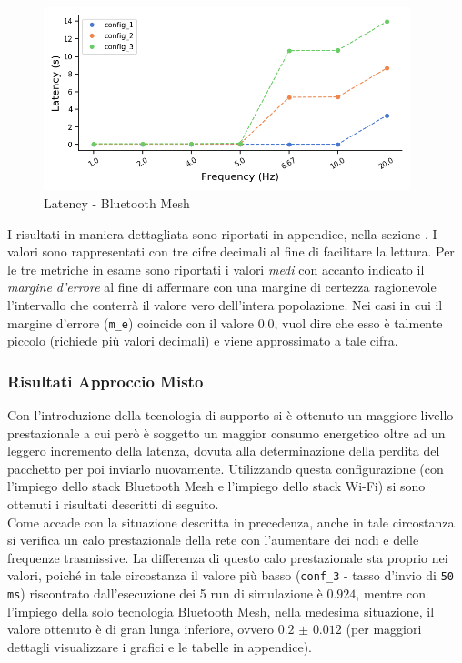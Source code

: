 \begin{figure}[hbt!]
    \centering
    \includegraphics[width = 0.95\textwidth]{images/graphs/ble_latency.png}
    \caption{Latency - Bluetooth Mesh}
    \label{graph:ble_latency}
\end{figure}

\noindent I risultati in maniera dettagliata sono riportati in appendice, nella sezione . I valori sono rappresentati con tre cifre decimali al fine di facilitare la lettura. Per le tre metriche in esame sono riportati i valori \textit{medi} con accanto indicato il \textit{margine d'errore} al fine di affermare con una margine di certezza ragionevole l'intervallo che conterrà il valore vero dell'intera popolazione. Nei casi in cui il margine d'errore (\texttt{m\_e}) coincide con il valore $0.0$, vuol dire che esso è talmente piccolo (richiede più valori decimali) e viene approssimato a tale cifra.

\subsubsection{Risultati Approccio Misto}
Con l'introduzione della tecnologia di supporto si è ottenuto un maggiore livello prestazionale a cui però è soggetto un maggior consumo energetico oltre ad un leggero incremento della latenza, dovuta alla determinazione della perdita del pacchetto per poi inviarlo nuovamente. Utilizzando questa configurazione (con l'impiego dello stack Bluetooth Mesh e l'impiego dello stack Wi-Fi) si sono ottenuti i risultati descritti di seguito.\\

\noindent Come accade con la situazione descritta in precedenza, anche in tale circostanza si verifica un calo prestazionale della rete con l'aumentare dei nodi e delle frequenze trasmissive. La differenza di questo calo prestazionale sta proprio nei valori, poiché in tale circostanza il valore più basso (\texttt{conf\_3} - tasso d'invio di \texttt{50 ms}) riscontrato dall'esecuzione dei 5 run di simulazione è $0.924$, mentre con l'impiego della solo tecnologia Bluetooth Mesh, nella medesima situazione, il valore ottenuto è di gran lunga inferiore, ovvero $0.2$ $\pm$ $0.012$ (per maggiori dettagli visualizzare i grafici e le tabelle in appendice).

